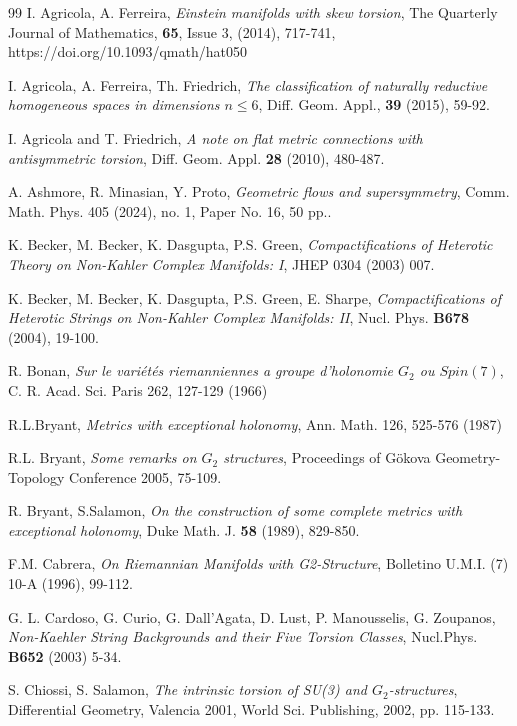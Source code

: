 \documentclass[10pt,british]{article}
\begin{document}
\begin{thebibliography}{99}
 I. Agricola, A. Ferreira, \emph{Einstein manifolds with skew torsion},
The Quarterly Journal of Mathematics, \textbf{65}, Issue 3,  (2014),  717-741, https://doi.org/10.1093/qmath/hat050

  I. Agricola, A. Ferreira, Th. Friedrich, \emph{The classification of naturally reductive homogeneous spaces in dimensions $n\le 6$}, Diff. Geom. Appl., \textbf{39} (2015), 59-92.

 I. Agricola and T. Friedrich, \emph{A note on flat metric connections with antisymmetric torsion}, Diff. Geom. Appl. \textbf{28} (2010), 480-487.

  A. Ashmore, R. Minasian, Y. Proto, \emph{Geometric flows and supersymmetry}, Comm. Math. Phys. 405 (2024), no. 1, Paper No. 16, 50 pp..%

 K. Becker, M. Becker, K. Dasgupta, P.S. Green,
{\em Compactifications of Heterotic Theory on Non-Kahler Complex
Manifolds: I}, JHEP 0304 (2003) 007.

  K. Becker, M. Becker, K. Dasgupta, P.S. Green, E. Sharpe,
\emph{ Compactifications of Heterotic Strings on Non-Kahler Complex Manifolds: II}, Nucl. Phys. {\bf B678} (2004), 19-100.

 R. Bonan,  \emph{Sur le vari\'et\'es riemanniennes a groupe d'holonomie $G_2$ ou $Spin(7)$}, C. R. Acad. Sci. Paris
262, 127-129 (1966)


 R.L.Bryant, \emph{Metrics with exceptional holonomy},  Ann. Math. 126, 525-576 (1987)

 R.L. Bryant, \emph{Some remarks on $G_2$ structures}, Proceedings of G\"okova Geometry-Topology
Conference 2005, 75-109.

 R. Bryant, S.Salamon, {\em On the construction of some
  complete metrics with exceptional holonomy}, Duke Math. J. {\bf 58}
  (1989), 829-850.

 F.M. Cabrera, \emph{On Riemannian Manifolds with G2-Structure}, Bolletino U.M.I. (7) 10-A
(1996), 99-112.

  G. L. Cardoso, G. Curio, G. Dall'Agata, D. Lust, P. Manousselis,
G. Zoupanos, {\em Non-Kaehler String Backgrounds and their Five
Torsion Classes}, Nucl.Phys. {\bf B652} (2003) 5-34.

 S. Chiossi, S. Salamon, {\em The intrinsic torsion of SU(3) and
  $G_2$-structures}, Differential Geometry, Valencia 2001, World Sci.
  Publishing, 2002, pp. 115-133.
  

\end{thebibliography}
\end{document}
